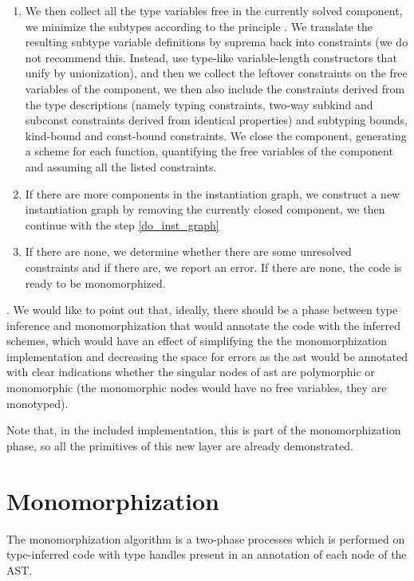 \begin{enumerate}
    \item We then collect all the type variables free in the currently solved component, we minimize the subtypes according to the principle . We translate the resulting subtype variable definitions by suprema back into constraints (we do not recommend this. Instead, use type-like variable-length constructors that unify by unionization), and then we collect the leftover constraints on the free variables of the component, we then also include the constraints derived from the type descriptions (namely typing constraints, two-way subkind and subconst constraints derived from identical properties) and subtyping bounds, kind-bound and const-bound constraints. We close the component, generating a scheme for each function, quantifying the free variables of the component and assuming all the listed constraints.

    \item If there are more components in the instantiation graph, we construct a new instantiation graph by removing the currently closed component, we then continue with the step \ref{do_inst_graph}

    \item If there are none, we determine whether there are some unresolved constraints and if there are, we report an error. If there are none, the code is ready to be monomorphized.
\end{enumerate}

. We would like to point out that, ideally, there should be a phase between type inference and monomorphization that would annotate the code with the inferred schemes, which would have an effect of simplifying the the monomorphization implementation and decreasing the space for errors as the ast would be annotated with clear indications whether the singular nodes of ast are polymorphic or monomorphic (the monomorphic nodes would have no free variables, they are monotyped).

Note that, in the included implementation, this is part of the monomorphization phase, so all the primitives of this new layer are already demonstrated.

\section{Monomorphization}

The monomorphization algorithm is a two-phase processes which is performed on type-inferred code with type handles present in an annotation of each node of the AST.

